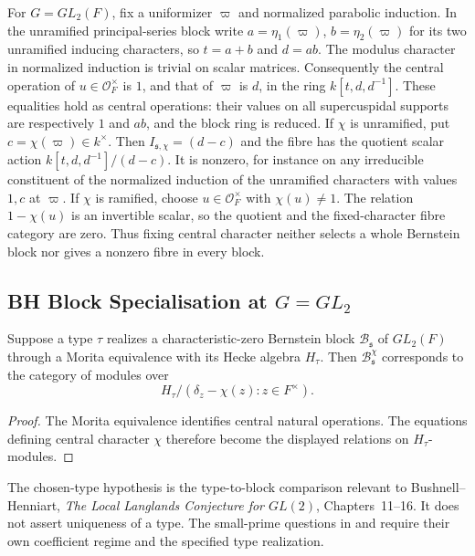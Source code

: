 For $G=GL_2(F)$, fix a uniformizer $\varpi$ and normalized
parabolic induction. In the unramified principal-series block write
$a=\eta_1(\varpi)$, $b=\eta_2(\varpi)$ for its two unramified
inducing characters, so $t=a+b$ and $d=ab$. The modulus character
in normalized induction is trivial on scalar matrices. Consequently
the central operation of $u\in\mathcal O_F^\times$ is $1$, and that
of $\varpi$ is $d$, in the ring $k[t,d,d^{-1}]$. These equalities
hold as central operations: their values on all supercuspidal supports
are respectively $1$ and $ab$, and the block ring is reduced.
If $\chi$ is unramified, put $c=\chi(\varpi)\in k^\times$.
Then $I_{\mathfrak s,\chi}=(d-c)$ and the fibre has the quotient
scalar action $k[t,d,d^{-1}]/(d-c)$. It is nonzero, for instance on
any irreducible constituent of the normalized induction of the
unramified characters with values $1,c$ at $\varpi$.
If $\chi$ is ramified, choose $u\in\mathcal O_F^\times$ with
$\chi(u)\ne1$. The relation $1-\chi(u)$ is an invertible scalar,
so the quotient and the fixed-character fibre category are zero.
Thus fixing central character neither selects a whole Bernstein
block nor gives a nonzero fibre in every block.

\subsection{BH Block Specialisation at \(G=GL_{2}\)}

\begin{proposition}
\label{v4-arith:w5-f:F1a3-AB:prop:BH-specialisation}
\ClaimStatusProvedHereConditional
Suppose a type \(\tau\) realizes a
characteristic-zero Bernstein block
\(\mathcal B_{\mathfrak s}\) of \(GL_2(F)\)
through a Morita equivalence with its Hecke
algebra \(H_\tau\). Then
\(\mathcal B_{\mathfrak s}^{\chi}\) corresponds
to the category of modules over
\[
 H_\tau/
   (\delta_z-\chi(z):z\in F^\times).
\]
\end{proposition}

\begin{proof}
The Morita equivalence identifies central
natural operations. The equations defining
central character \(\chi\) therefore become
the displayed relations on \(H_\tau\)-modules.
\end{proof}

The chosen-type hypothesis is the type-to-block comparison relevant to
Bushnell--Henniart, \emph{The Local Langlands Conjecture for $GL(2)$},
Chapters~11--16. It does not assert uniqueness of a type. The small-prime
questions in  and
 require their own coefficient
regime and the specified type realization.

